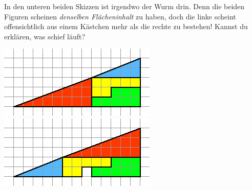\documentclass{../zirkelblatt}
\begin{document}
In den unteren beiden Skizzen ist irgendwo der Wurm drin. Denn die beiden
Figuren scheinen \emph{denselben Flächeninhalt} zu haben, doch die linke
scheint offensichtlich aus einem Kästchen mehr als die rechte zu bestehen!
Kannst du erklären, was schief läuft?

\begin{center}
  \includegraphics[scale=0.8]{ein-kaestchen-verschwindet-1}
  \hfill
  \includegraphics[scale=0.8]{ein-kaestchen-verschwindet-2}
\end{center}
\end{document}
